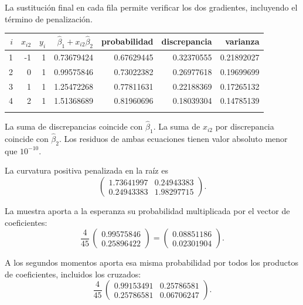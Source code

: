 \documentclass[11pt,a4paper]{article}
\begin{document}
La sustitución final en cada fila permite verificar
los dos gradientes, incluyendo el término de penalización.
\begin{center}\scriptsize
\begin{tabular}{rrrrrrr}\toprule
\(i\)&\(x_{i2}\)&\(y_i\)&\(\widehat\beta_1+x_{i2}\widehat\beta_2\)&probabilidad&discrepancia&varianza\\\midrule
1&-1&1&0.73679424&0.67629445&0.32370555&0.21892027\\
2&0&1&0.99575846&0.73022382&0.26977618&0.19699699\\
3&1&1&1.25472268&0.77811631&0.22188369&0.17265132\\
4&2&1&1.51368689&0.81960696&0.18039304&0.14785139\\
\\\bottomrule\end{tabular}\end{center}
La suma de discrepancias coincide con \(\widehat\beta_1\).
La suma de \(x_{i2}\) por discrepancia coincide con
\(\widehat\beta_2\). Los residuos de ambas ecuaciones
tienen valor absoluto menor que \(10^{-10}\).

La curvatura positiva penalizada en la raíz es
\[
\begin{pmatrix}1.73641997&0.24943383\\0.24943383&1.98297715\end{pmatrix}.
\]

La muestra aporta a la esperanza su probabilidad
multiplicada por el vector de coeficientes:
\[
\frac{4}{45}\,\begin{pmatrix}0.99575846\\0.25896422\end{pmatrix}=\begin{pmatrix}0.08851186\\0.02301904\end{pmatrix}.
\]

A los segundos momentos aporta esa misma probabilidad
por todos los productos de coeficientes, incluidos los cruzados:
\[
\frac{4}{45}\,\begin{pmatrix}0.99153491&0.25786581\\0.25786581&0.06706247\end{pmatrix}.
\]
\end{document}
